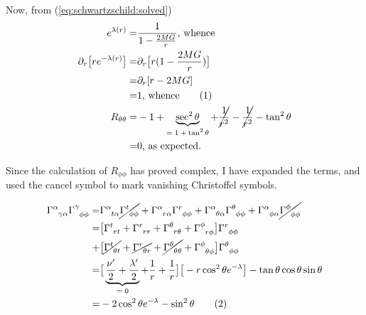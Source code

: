 \documentclass[]{article}
\newcommand\numberthis{\addtocounter{equation}{1}\tag{\theequation}}
\begin{document}
 Now, from (\ref{eq:schwartzschild:solved})
\begin{align*}
	e^{\lambda(r)} =& \frac{1}{1 - \frac{2MG}{r}} \text{, whence}\\
	\partial_r \big[r  e^{-\lambda(r)}\big] =& \partial_r \big[r(1 - \frac{2MG}{r})\big]\\
	=& \partial_r [r-2MG]\\
	=& 1 \text{, whence} \numberthis \label{eq:dL}\\
	R_{\theta\theta} =& - 1 + \underbrace{\sec^2 \theta}_\text{$=1+\tan^2 \theta$} + \cancel{\frac{1}{r^2}} -\cancel{\frac{1}{r^2}} - \tan^2 \theta \\
	=& 0 \text{, as expected.}
\end{align*}

Since the calculation of $R_{\phi\phi}$ has proved complex, I have expanded the terms, and used the cancel symbol to mark vanishing Christoffel symbols.

\begin{align*}
	\Gamma\indices{^\alpha_{\gamma\alpha}} \Gamma\indices{^\gamma_{\phi\phi}} =&\Gamma\indices{^\alpha_{t\alpha}} \cancel{\Gamma\indices{^t_{\phi\phi}}}+ \Gamma\indices{^\alpha_{r\alpha}} \Gamma\indices{^r_{\phi\phi}}+\Gamma\indices{^\alpha_{\theta\alpha}} \Gamma\indices{^\theta_{\phi\phi}}+\Gamma\indices{^\alpha_{\phi\alpha}} \cancel{\Gamma\indices{^\phi_{\phi\phi}}}\\
	=&\big[\Gamma\indices{^t_{rt}}+\Gamma\indices{^r_{rr}}+\Gamma\indices{^\theta_{r\theta}}+\Gamma\indices{^\phi_{r\phi}}\big] \Gamma\indices{^r_{\phi\phi}}\\
	+&\big[\cancel{\Gamma\indices{^t_{\theta t}}}+\cancel{\Gamma\indices{^r_{\theta r}}}+\cancel{\Gamma\indices{^\theta_{\theta\theta}}}+\Gamma\indices{^\phi_{\theta\phi}}\big] \Gamma\indices{^\theta_{\phi\phi}}\\
	=& \big[\underbrace{\frac{\nu^\prime}{2} + \frac{\lambda^\prime}{2}}_\text{$=0$}+\frac{1}{r}+\frac{1}{r}\big]\big[-r \cos^2\theta e^{-\lambda}\big] - \tan \theta \cos \theta \sin \theta\\
	=& - 2 \cos^2\theta e^{-\lambda} -\sin^2\theta\numberthis \label{eq:prod:1}
\end{align*}
\end{document}
